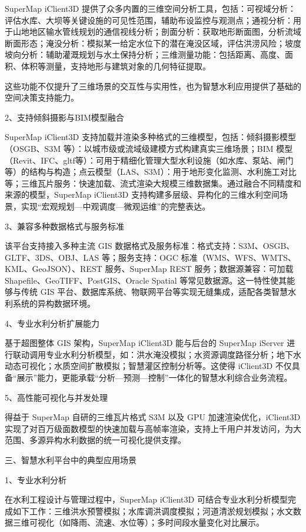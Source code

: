 SuperMap iClient3D 提供了众多内置的三维空间分析工具，包括：可视域分析：评估水库、大坝等关键设施的可见性范围，辅助布设监控与观测点；通视分析：用于山地地区输水管线规划的通信视线分析；剖面分析：获取地形断面图，分析流域断面形态；淹没分析：模拟某一给定水位下的潜在淹没区域，评估洪涝风险；坡度坡向分析：辅助灌溉规划与水土保持分析；三维测量功能：包括距离、高度、面积、体积等测量，支持地形与建筑对象的几何特征提取。

这些功能不仅提升了三维场景的交互性与实用性，也为智慧水利应用提供了基础的空间决策支持能力。

2、支持倾斜摄影与BIM模型融合

SuperMap iClient3D 支持加载并渲染多种格式的三维模型，包括：倾斜摄影模型（OSGB、S3M 等）：以城市级或流域级建模方式构建真实三维场景；BIM 模型（Revit、IFC、gltf等）：可用于精细化管理大型水利设施（如水库、泵站、闸门等）的结构与构造；点云模型（LAS、S3M）：用于地形变化监测、水利施工对比等；三维瓦片服务：快速加载、流式渲染大规模三维数据集。通过融合不同精度和来源的模型，SuperMap iClient3D 支持构建多层级、异构化的三维水利空间场景，实现``宏观规划---中观调度---微观运维''的完整表达。

3、兼容多种数据格式与服务标准

该平台支持接入多种主流 GIS 数据格式及服务标准：格式支持：S3M、OSGB、GLTF、3DS、OBJ、LAS 等；服务支持：OGC 标准（WMS、WFS、WMTS、KML、GeoJSON）、REST 服务、SuperMap REST 服务；数据源兼容：可加载 Shapefile、GeoTIFF、PostGIS、Oracle Spatial 等常见数据源。这一特性使其能够与传统 GIS 平台、数据库系统、物联网平台等实现无缝集成，适配各类智慧水利系统的异构数据环境。

4、专业水利分析扩展能力

基于超图整体 GIS 架构，SuperMap iClient3D 能与后台的 SuperMap iServer 进行联动调用专业水利分析模型，如：洪水淹没模拟；水资源调度路径分析；地下水动态可视化；水质空间扩散模拟；智慧灌区控制分析等。这使得 iClient3D 不仅具备``展示''能力，更能承载``分析---预测---控制''一体化的智慧水利综合业务流程。

5、高性能可视化与并发处理

得益于 SuperMap 自研的三维瓦片格式 S3M 以及 GPU 加速渲染优化，iClient3D 实现了对百万级面数模型的快速加载与高帧率渲染，支持上千用户并发访问，为大范围、多源异构水利数据的统一可视化提供支撑。

三、智慧水利平台中的典型应用场景

1、专业水利分析

在水利工程设计与管理过程中，SuperMap iClient3D 可结合专业水利分析模型完成如下工作：三维洪水预警模拟；水库调洪调度模拟；河道清淤规划模拟；水文数据三维可视化（如降雨、流速、水位等）；多时间段水量变化对比展示。

